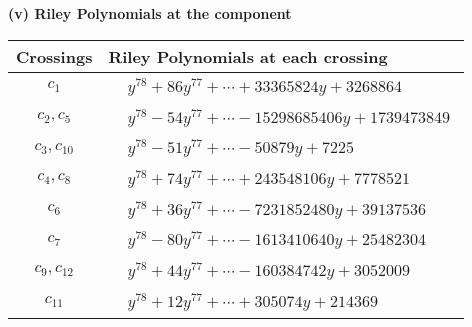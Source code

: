 \documentclass[1p]{elsarticle_modified}
\theoremstyle{definition}
\begin{document}
\newpage\renewcommand{\arraystretch}{1}
\flushleft \textbf{(v) Riley Polynomials at the component}\newline \\
\begin{tabular}{m{50pt}|m{274pt}}
Crossings & \hspace{64pt}Riley Polynomials at each crossing \\
\hline $$\begin{aligned}c_{1}\end{aligned}$$&$\begin{aligned}
&y^{78}+86 y^{77}+\cdots+33365824 y+3268864
\end{aligned}$\\
\hline $$\begin{aligned}c_{2},c_{5}\end{aligned}$$&$\begin{aligned}
&y^{78}-54 y^{77}+\cdots-15298685406 y+1739473849
\end{aligned}$\\
\hline $$\begin{aligned}c_{3},c_{10}\end{aligned}$$&$\begin{aligned}
&y^{78}-51 y^{77}+\cdots-50879 y+7225
\end{aligned}$\\
\hline $$\begin{aligned}c_{4},c_{8}\end{aligned}$$&$\begin{aligned}
&y^{78}+74 y^{77}+\cdots+243548106 y+7778521
\end{aligned}$\\
\hline $$\begin{aligned}c_{6}\end{aligned}$$&$\begin{aligned}
&y^{78}+36 y^{77}+\cdots-7231852480 y+39137536
\end{aligned}$\\
\hline $$\begin{aligned}c_{7}\end{aligned}$$&$\begin{aligned}
&y^{78}-80 y^{77}+\cdots-1613410640 y+25482304
\end{aligned}$\\
\hline $$\begin{aligned}c_{9},c_{12}\end{aligned}$$&$\begin{aligned}
&y^{78}+44 y^{77}+\cdots-160384742 y+3052009
\end{aligned}$\\
\hline $$\begin{aligned}c_{11}\end{aligned}$$&$\begin{aligned}
&y^{78}+12 y^{77}+\cdots+305074 y+214369
\end{aligned}$\\
\hline
\end{tabular}\\~\\
\end{document}
